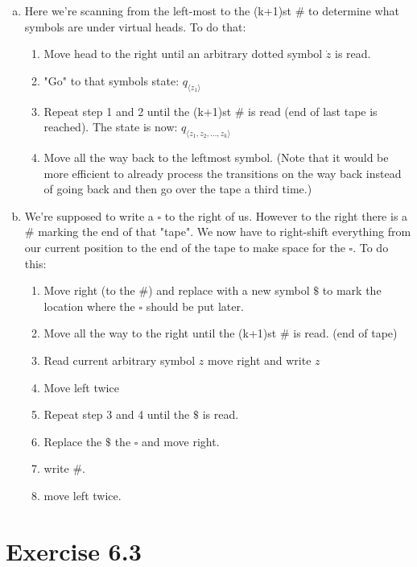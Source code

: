\documentclass{article} %
\newcommand{\homeworkNumber}{6}
\begin{document}
\begin{enumerate}[(a)]
\item
Here we're scanning from the left-most to the (k+1)st $\#$ to determine what symbols are under virtual heads. To do that:
\begin{enumerate}[1.]
\item Move head to the right until an arbitrary dotted symbol $\dot{z}$ is read.
\item "Go" to that symbols state: $q_{\langle z_1 \rangle}$
\item Repeat step 1 and 2 until the (k+1)st $\#$ is read (end of last tape is reached). The state is now: $q_{\langle z_1, z_2, \dots, z_k \rangle}$
\item Move all the way back to the leftmost symbol. (Note that it would be more efficient to already process the transitions on the way back instead of going back and then go over the tape a third time.)
\end{enumerate}
\clearpage
\item
We're supposed to write a $\square$ to the right of us. However to the right there is a $\#$ marking the end of that "tape". We now have to right-shift everything from our current position to the end of the tape to make space for the $\square$. To do this:
\begin{enumerate}[1.]
\item Move right (to the $\#$) and replace with a new symbol $\$$ to mark the location where the $\square$ should be put later.
\item Move all the way to the right until the (k+1)st $\#$ is read. (end of tape)
\item Read current arbitrary symbol $z$ move right and write $z$
\item Move left twice
\item Repeat step 3 and 4 until the $\$$ is read.
\item Replace the $\$$ the $\square$ and move right.
\item write $\#$.
\item move left twice.
\end{enumerate}

\end{enumerate}

\clearpage




\section*{Exercise \homeworkNumber.3}
\end{document}
